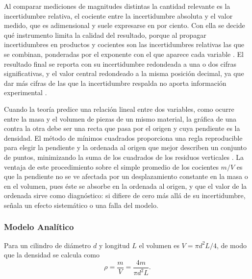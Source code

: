 Al comparar mediciones de magnitudes distintas la cantidad relevante es la incertidumbre relativa, el cociente entre la incertidumbre absoluta y el valor medido, que es adimensional y suele expresarse en por ciento. Con ella se decide qué instrumento limita la calidad del resultado, porque al propagar incertidumbres en productos y cocientes son las incertidumbres relativas las que se combinan, ponderadas por el exponente con el que aparece cada variable \cite{taylor}. El resultado final se reporta con su incertidumbre redondeada a una o dos cifras significativas, y el valor central redondeado a la misma posición decimal, ya que dar más cifras de las que la incertidumbre respalda no aporta información experimental \cite{baird}.

Cuando la teoría predice una relación lineal entre dos variables, como ocurre entre la masa y el volumen de piezas de un mismo material, la gráfica de una contra la otra debe ser una recta que pasa por el origen y cuya pendiente es la densidad. El método de mínimos cuadrados proporciona una regla reproducible para elegir la pendiente y la ordenada al origen que mejor describen un conjunto de puntos, minimizando la suma de los cuadrados de los residuos verticales \cite{baird, taylor}. La ventaja de este procedimiento sobre el simple promedio de los cocientes $m/V$ es que la pendiente no se ve afectada por un desplazamiento constante en la masa o en el volumen, pues éste se absorbe en la ordenada al origen, y que el valor de la ordenada sirve como diagnóstico: si difiere de cero más allá de su incertidumbre, señala un efecto sistemático o una falla del modelo.

\subsubsection{Modelo Analítico}

Para un cilindro de diámetro $d$ y longitud $L$ el volumen es $V = \pi d^{2} L/4$, de modo que la densidad se calcula como
\begin{equation}
    \rho = \frac{m}{V} = \frac{4m}{\pi d^{2} L}.
    \label{eq:rho}
\end{equation}

